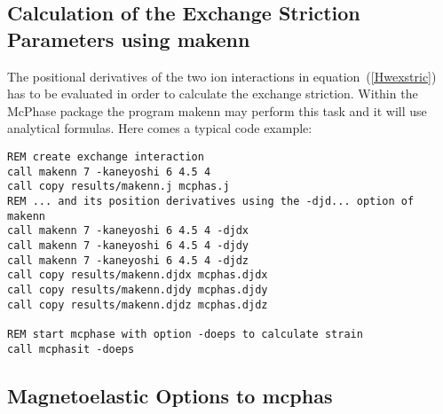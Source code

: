 \subsection{Calculation of the Exchange Striction Parameters using {\prg makenn}}\label{determineExstricpar}

The positional derivatives of the two ion interactions in equation~(\ref{Hwexstric})
has to be evaluated in order to calculate the exchange striction. Within the McPhase 
package the program {\prg makenn}  may perform this task and it will use analytical formulas.
Here comes a typical code example:

\begin{verbatim}
REM create exchange interaction
call makenn 7 -kaneyoshi 6 4.5 4
call copy results/makenn.j mcphas.j
REM ... and its position derivatives using the -djd... option of makenn
call makenn 7 -kaneyoshi 6 4.5 4 -djdx
call makenn 7 -kaneyoshi 6 4.5 4 -djdy
call makenn 7 -kaneyoshi 6 4.5 4 -djdz
call copy results/makenn.djdx mcphas.djdx
call copy results/makenn.djdy mcphas.djdy
call copy results/makenn.djdz mcphas.djdz

REM start mcphase with option -doeps to calculate strain
call mcphasit -doeps 
\end{verbatim}

\subsection{Magnetoelastic Options to {\prg mcphas}}\label{magelastmcphasoptions}

